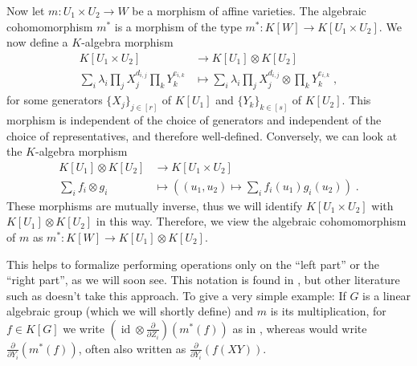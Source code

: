   Now let $m \colon U_1 \times U_2 \rightarrow W$ be a morphism of affine varieties.
  The algebraic cohomomorphism $m^\ast$ is a morphism of the type $m^\ast \colon K[W] \rightarrow K[U_1 \times U_2]$.
  We now define a $K$-algebra morphism
  \begin{equation*}
    \begin{aligned}
      K[U_1 \times U_2]
      & \longrightarrow K[U_1] \otimes K[U_2]\\
      \sum_i \lambda_i \prod_j X_{j}^{d_{i,j}} \prod_k Y_{k}^{e_{i,k}} &\longmapsto \sum_i \lambda_i \prod_j X_{j}^{d_{i,j}} \otimes \prod_k Y_{k}^{e_{i,k}} \; ,
    \end{aligned}
  \end{equation*}
  for some generators $\{X_j\}_{j\in [r]}$ of $K[U_1]$ and $\{Y_k\}_{k \in[s]}$ of $K[U_2]$.
  This morphism is independent of the choice of generators and independent of the choice of representatives, and therefore well-defined.
  Conversely, we can look at the $K$-algebra morphism
  \begin{equation*}
    \begin{aligned}
      K[U_1]\otimes K[U_2] &\longrightarrow K[U_1 \times U_2] \\
      \sum_i f_i \otimes g_i &\longmapsto \left( (u_1,u_2) \mapsto \sum_i f_i(u_1)g_i(u_2)\right) \; .
    \end{aligned}
  \end{equation*}
  These morphisms are mutually inverse, thus we will identify $K[U_1 \times U_2]$ with $K[U_1]\otimes K[U_2]$ in this way.
  Therefore, we view the algebraic cohomomorphism of $m$ as $m^\ast \colon K[W] \rightarrow K[U_1] \otimes K[U_2]$. 
  
This helps to formalize performing operations only on the ``left part'' or the ``right part'', as we will soon see.
This notation is found in \cite{DK15}, but other literature such as \cite{Stu08} doesn't take this approach.
To give a very simple example:
If $G$ is a linear algebraic group (which we will shortly define) and $m$ is its multiplication, for $f \in  K[G] $ we write $(\operatorname{id} \otimes \frac{\partial}{\partial Z_i}) (m^\ast (f))$ as in \cite{DK15}, whereas \cite{Stu08} would write $\frac{\partial}{\partial Y_i} (m^\ast (f))$, often also written as $\frac{\partial}{\partial Y_i} (f(XY))$.

